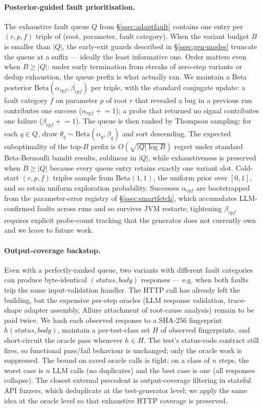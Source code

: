 \documentclass[conference]{IEEEtran}
\begin{document}
\paragraph{Posterior-guided fault prioritisation.}
The exhaustive fault queue $Q$ from \S\ref{ssec:adaptfault} contains one entry per $(r, p, f)$ triple of (root, parameter, fault category). When the variant budget $B$ is smaller than $|Q|$, the early-exit guards described in \S\ref{ssec:gen-modes} truncate the queue at a suffix --- ideally the least informative one. Order matters even when $B \ge |Q|$: under early termination from streaks of zero-step variants or dedup exhaustion, the queue prefix is what actually ran. We maintain a Beta posterior $\mathrm{Beta}(\alpha_{rpf}, \beta_{rpf})$ per triple, with the standard conjugate update: a fault category $f$ on parameter $p$ of root $r$ that revealed a bug in a previous run contributes one success ($\alpha_{rpf} \mathrel{+}= 1$); a probe that returned no signal contributes one failure ($\beta_{rpf} \mathrel{+}= 1$). The queue is then ranked by Thompson sampling: for each $q \in Q$, draw $\theta_q \sim \mathrm{Beta}(\alpha_q, \beta_q)$ and sort descending. The expected suboptimality of the top-$B$ prefix is $O(\sqrt{|Q| \log B})$ regret under standard Beta-Bernoulli bandit results, sublinear in $|Q|$, while exhaustiveness is preserved when $B \ge |Q|$ because every queue entry retains exactly one variant slot. Cold-start $(r, p, f)$ triples sample from $\mathrm{Beta}(1, 1)$, the uniform prior over $[0, 1]$, and so retain uniform exploration probability. Successes $\alpha_{rpf}$ are bootstrapped from the parameter-error registry of \S\ref{ssec:smartfetch}, which accumulates LLM-confirmed faults across runs and so survives JVM restarts; tightening $\beta_{rpf}$ requires explicit probe-count tracking that the generator does not currently own and we leave to future work.

\paragraph{Output-coverage backstop.}
Even with a perfectly-ranked queue, two variants with different fault categories can produce byte-identical $(\textit{status}, \textit{body})$ responses --- e.g. when both faults trip the same input-validation handler. The HTTP call has already left the building, but the expensive per-step oracles (LLM response validation, trace-shape adapter assembly, Allure attachment of root-cause analysis) remain to be paid twice. We hash each observed response to a SHA-256 fingerprint $h(\textit{status}, \textit{body})$, maintain a per-test-class set $H$ of observed fingerprints, and short-circuit the oracle pass whenever $h \in H$. The test's status-code contract still fires, so functional pass/fail behaviour is unchanged; only the oracle work is suppressed. The bound on saved oracle calls is tight: on a class of $n$ steps, the worst case is $n$ LLM calls (no duplicates) and the best case is one (all responses collapse). The closest external precedent is output-coverage filtering in stateful API fuzzers, which deduplicate at the test-generator level; we apply the same idea at the oracle level so that exhaustive HTTP coverage is preserved.
\end{document}
